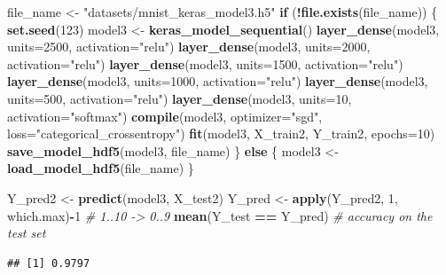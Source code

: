 \documentclass[10pt,b5paper,krantz1]{krantz}
\newenvironment{Shaded}{\begin{snugshade}}{\end{snugshade}}
\newcommand{\CommentTok}[1]{\textcolor[rgb]{0.37,0.37,0.37}{\textit{#1}}}
\newcommand{\ControlFlowTok}[1]{\textcolor[rgb]{0.27,0.27,0.27}{\textbf{#1}}}
\newcommand{\DataTypeTok}[1]{\textcolor[rgb]{0.27,0.27,0.27}{#1}}
\newcommand{\DecValTok}[1]{\textcolor[rgb]{0.06,0.06,0.06}{#1}}
\newcommand{\KeywordTok}[1]{\textcolor[rgb]{0.27,0.27,0.27}{\textbf{#1}}}
\newcommand{\NormalTok}[1]{#1}
\newcommand{\OperatorTok}[1]{\textcolor[rgb]{0.43,0.43,0.43}{\textbf{#1}}}
\newcommand{\StringTok}[1]{\textcolor[rgb]{0.5,0.5,0.5}{#1}}
\begin{document}
\begin{Shaded}
\begin{Highlighting}[]
\NormalTok{file_name <-}\StringTok{ "datasets/mnist_keras_model3.h5"}
\ControlFlowTok{if}\NormalTok{ (}\OperatorTok{!}\KeywordTok{file.exists}\NormalTok{(file_name)) \{}
    \KeywordTok{set.seed}\NormalTok{(}\DecValTok{123}\NormalTok{)}
\NormalTok{    model3 <-}\StringTok{ }\KeywordTok{keras_model_sequential}\NormalTok{()}
    \KeywordTok{layer_dense}\NormalTok{(model3, }\DataTypeTok{units=}\DecValTok{2500}\NormalTok{, }\DataTypeTok{activation=}\StringTok{"relu"}\NormalTok{)}
    \KeywordTok{layer_dense}\NormalTok{(model3, }\DataTypeTok{units=}\DecValTok{2000}\NormalTok{, }\DataTypeTok{activation=}\StringTok{"relu"}\NormalTok{)}
    \KeywordTok{layer_dense}\NormalTok{(model3, }\DataTypeTok{units=}\DecValTok{1500}\NormalTok{, }\DataTypeTok{activation=}\StringTok{"relu"}\NormalTok{)}
    \KeywordTok{layer_dense}\NormalTok{(model3, }\DataTypeTok{units=}\DecValTok{1000}\NormalTok{, }\DataTypeTok{activation=}\StringTok{"relu"}\NormalTok{)}
    \KeywordTok{layer_dense}\NormalTok{(model3, }\DataTypeTok{units=}\DecValTok{500}\NormalTok{,  }\DataTypeTok{activation=}\StringTok{"relu"}\NormalTok{)}
    \KeywordTok{layer_dense}\NormalTok{(model3, }\DataTypeTok{units=}\DecValTok{10}\NormalTok{,   }\DataTypeTok{activation=}\StringTok{"softmax"}\NormalTok{)}
    \KeywordTok{compile}\NormalTok{(model3, }\DataTypeTok{optimizer=}\StringTok{"sgd"}\NormalTok{,}
            \DataTypeTok{loss=}\StringTok{"categorical_crossentropy"}\NormalTok{)}
    \KeywordTok{fit}\NormalTok{(model3, X_train2, Y_train2, }\DataTypeTok{epochs=}\DecValTok{10}\NormalTok{)}
    \KeywordTok{save_model_hdf5}\NormalTok{(model3, file_name)}
\NormalTok{\} }\ControlFlowTok{else}\NormalTok{ \{}
\NormalTok{    model3 <-}\StringTok{ }\KeywordTok{load_model_hdf5}\NormalTok{(file_name)}
\NormalTok{\}}

\NormalTok{Y_pred2 <-}\StringTok{ }\KeywordTok{predict}\NormalTok{(model3, X_test2)}
\NormalTok{Y_pred <-}\StringTok{ }\KeywordTok{apply}\NormalTok{(Y_pred2, }\DecValTok{1}\NormalTok{, which.max)}\OperatorTok{-}\DecValTok{1} \CommentTok{# 1..10 -> 0..9}
\KeywordTok{mean}\NormalTok{(Y_test }\OperatorTok{==}\StringTok{ }\NormalTok{Y_pred) }\CommentTok{# accuracy on the test set}
\end{Highlighting}
\end{Shaded}

\begin{verbatim}
## [1] 0.9797
\end{verbatim}
\end{document}
